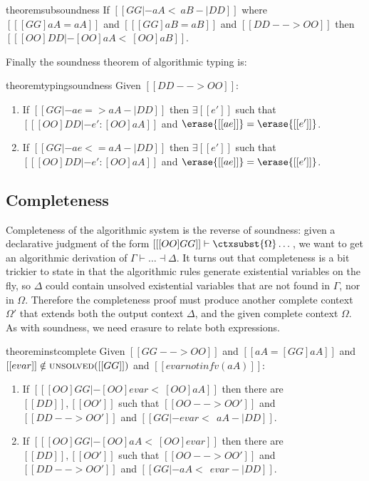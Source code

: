 \begin{restatable}{theorem}{subsoundness} \label{thm:sub_soundness}%
  If $[[  GG |- aA <~ aB -| DD ]]$ where $[[ [GG]aA = aA  ]]$ and $[[  [GG] aB = aB  ]]$ and $[[  DD --> OO ]]$ then
  $[[  [OO]DD |- [OO]aA <~ [OO]aB   ]]$.
\end{restatable}

Finally the soundness theorem of algorithmic typing is:

\begin{restatable}{theorem}{typingsoundness} \label{thm:type_sound}%
  Given $[[DD --> OO]]$:
  \begin{enumerate}
  \item If $[[  GG |- ae => aA -| DD  ]]$ then $\exists [[e']]$ such that $ [[  [OO]DD |- e' : [OO] aA  ]]   $ and $\erase{[[ae]]} = \erase{[[e']]}$.
  \item If $[[  GG |- ae <= aA -| DD  ]]$ then $\exists [[e']]$ such that $ [[  [OO]DD |- e' : [OO] aA  ]]   $ and $\erase{[[ae]]} = \erase{[[e']]}$.
  \end{enumerate}
\end{restatable}

\subsection{Completeness}

Completeness of the algorithmic system is the reverse of soundness: given a
declarative judgment of the form $[[  [OO]GG  ]] \vdash
\ctxsubst{\Omega} \dots $, we want to get an algorithmic derivation of $\Gamma
\vdash \dots \dashv \Delta$. It turns out that completeness is a bit trickier to
state in that the algorithmic rules generate existential variables on the fly,
so $\Delta$ could contain unsolved existential variables that are not found in
$\Gamma$, nor in $\Omega$. Therefore the completeness proof must produce another
complete context $\Omega'$ that extends both the output context $\Delta$, and
the given complete context $\Omega$. As with soundness, we need erasure to
relate both expressions.


\begin{restatable}{theorem}{instcomplete} \label{thm:inst_complete}
  Given $[[GG --> OO]]$ and $[[aA = [GG]aA]]$ and $[[evar]] \notin \textsc{unsolved}([[GG]]) $ and $[[  evar notin fv(aA)  ]]$:
  \begin{enumerate}
  \item If $[[ [OO]GG |- [OO] evar <~ [OO]aA   ]]$ then there are $[[DD]], [[OO']]$ such that $[[OO --> OO']]$
    and $[[DD --> OO']]$ and $[[GG |- evar <~~ aA -| DD]]$.
  \item If $[[ [OO]GG |- [OO]aA  <~ [OO] evar  ]]$ then there are $[[DD]], [[OO']]$ such that $[[OO --> OO']]$
    and $[[DD --> OO']]$ and $[[GG |- aA <~~ evar -| DD]]$.
  \end{enumerate}

\end{restatable}

